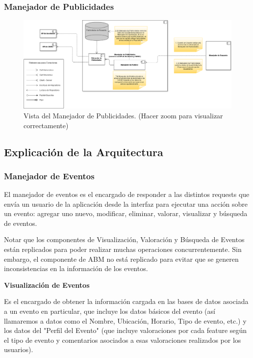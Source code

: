 \subsubsection{Manejador de Publicidades}

\begin{figure}[H]
  \centering
  \includegraphics[width=\textwidth]{diagramas/ManejadorDePublicidades.png}
  \caption{\normalfont Vista del Manejador de Publicidades. (Hacer zoom para visualizar correctamente)}
\end{figure} 

\subsection{Explicación de la Arquitectura}

\subsubsection{Manejador de Eventos}

El manejador de eventos es el encargado de responder a las distintos requests que envía un usuario de la aplicación desde la interfaz para ejecutar una acción sobre un evento: agregar uno nuevo, modificar, eliminar, valorar, visualizar y búsqueda de eventos.

Notar que los componentes de Visualización, Valoración y Búsqueda de Eventos están replicados para poder realizar muchas operaciones concurrentemente. Sin embargo, el componente de ABM no está replicado para evitar que se generen inconsistencias en la información de los eventos.

\textbf{Visualización de Eventos}

Es el encargado de obtener la información cargada en las bases de datos asociada a un evento en particular, que incluye los datos básicos del evento (así llamaremos a datos como el Nombre, Ubicación, Horario, Tipo de evento, etc.) y los datos del "Perfil del Evento" (que incluye valoraciones por cada feature según el tipo de evento y comentarios asociados a esas valoraciones realizados por los usuarios).

